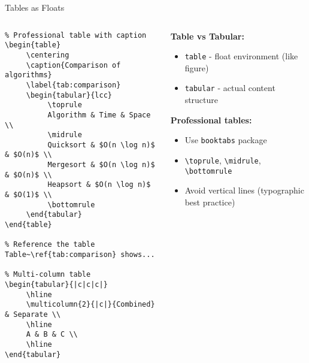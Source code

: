 \begin{frame}[fragile]{Tables as Floats}
     \begin{columns}
          \begin{column}{0.5\textwidth}
               \begin{lstlisting}
% Professional table with caption
\begin{table}
     \centering
     \caption{Comparison of algorithms}
     \label{tab:comparison}
     \begin{tabular}{lcc}
          \toprule
          Algorithm & Time & Space \\
          \midrule
          Quicksort & $O(n \log n)$ & $O(n)$ \\
          Mergesort & $O(n \log n)$ & $O(n)$ \\
          Heapsort & $O(n \log n)$ & $O(1)$ \\
          \bottomrule
     \end{tabular}
\end{table}

% Reference the table
Table~\ref{tab:comparison} shows...

% Multi-column table
\begin{tabular}{|c|c|c|}
     \hline
     \multicolumn{2}{|c|}{Combined} & Separate \\
     \hline
     A & B & C \\
     \hline
\end{tabular}
               \end{lstlisting}
          \end{column}
          
          \begin{column}{0.5\textwidth}
               \textbf{Table vs Tabular:}
               \begin{itemize}
                    \item \texttt{table} - float environment (like figure)
                    \item \texttt{tabular} - actual content structure
               \end{itemize}
               
               \textbf{Professional tables:}
               \begin{itemize}
                    \item Use \texttt{booktabs} package
                    \item \texttt{\textbackslash toprule}, \texttt{\textbackslash midrule}, \texttt{\textbackslash bottomrule}
                    \item Avoid vertical lines (typographic best practice)
               \end{itemize}
               

\end{column}
\end{columns}
\end{frame}
